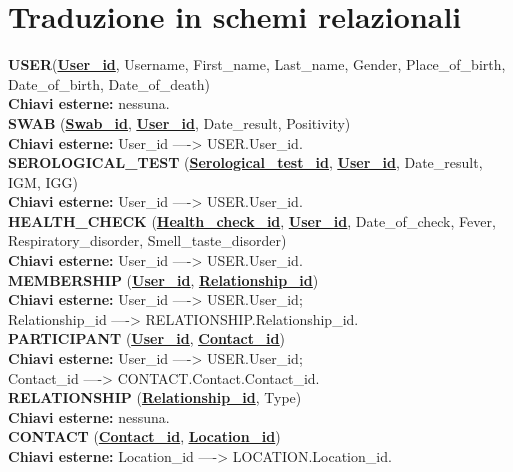 \documentclass[a4paper]{book}
\begin{document}
		\section{Traduzione in schemi relazionali}
		
			\textbf{USER}(\underline{\textbf{User\_id}}, Username, First\_name, Last\_name, Gender, Place\_of\_birth, Date\_of\_birth, Date\_of\_death)\\
			\textbf{Chiavi esterne:} nessuna.\\
			
			\textbf{SWAB} (\underline{\textbf{Swab\_id}}, \underline{\underline{\textbf{User\_id}}}, Date\_result, Positivity)\\
			\textbf{Chiavi esterne:} User\_id ----> USER.User\_id.\\
			
			\textbf{SEROLOGICAL\_TEST} (\underline{\textbf{Serological\_test\_id}}, \underline{\underline{\textbf{User\_id}}}, Date\_result, IGM, IGG)\\
			\textbf{Chiavi esterne:} User\_id ----> USER.User\_id.\\
			
			\textbf{HEALTH\_CHECK} (\underline{\textbf{Health\_check\_id}}, \underline{\underline{\textbf{User\_id}}}, Date\_of\_check, Fever, Respiratory\_disorder, Smell\_taste\_disorder)\\
			\textbf{Chiavi esterne:} User\_id ----> USER.User\_id.\\
			
			\textbf{MEMBERSHIP} (\underline{\underline{\textbf{User\_id}}}, \underline{\underline{\textbf{Relationship\_id}}})\\
			\textbf{Chiavi esterne:} User\_id ----> USER.User\_id;\\ Relationship\_id ----> RELATIONSHIP.Relationship\_id.\\
			
			\textbf{PARTICIPANT} (\underline{\underline{\textbf{User\_id}}}, \underline{\underline{\textbf{Contact\_id}}})\\
			\textbf{Chiavi esterne:} User\_id ----> USER.User\_id;\\
			Contact\_id ----> CONTACT.Contact.Contact\_id.\\
			
			\textbf{RELATIONSHIP} (\underline{\textbf{Relationship\_id}}, Type)\\
			\textbf{Chiavi esterne:} nessuna.\\
			
			\textbf{CONTACT} (\underline{\textbf{Contact\_id}}, \underline{\underline{\textbf{Location\_id}}})\\
			\textbf{Chiavi esterne:} Location\_id ----> LOCATION.Location\_id.\\
\end{document}
